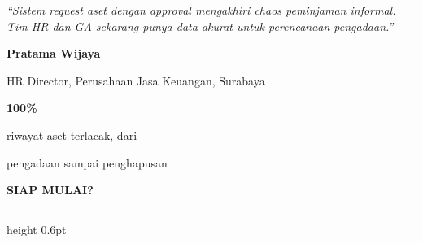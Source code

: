 \documentclass[a4paper]{article}
\newcommand{\sectiontitle}[1]{%
    \vspace{10pt}%
    {\fontsize{13}{16}\selectfont\bfseries\color{BlueDark} #1}\par\vspace{3pt}%
    {\color{BluePrimary}\hrule height 0.6pt}\par\vspace{8pt}}
\begin{document}
\noindent
\begin{minipage}[t]{0.485\textwidth}
    \colorbox{BlueBg}{%
        \begin{minipage}{\dimexpr\linewidth-2\fboxsep\relax}
            {\fontsize{9.5}{13}\selectfont\color{TextDark}\textit{``Sistem request aset dengan approval mengakhiri chaos peminjaman informal. Tim HR dan GA sekarang punya data akurat untuk perencanaan pengadaan.''}}\par\vspace{4pt}
            {\fontsize{8.5}{11}\selectfont\bfseries\color{BluePrimary} Pratama Wijaya}\par
            {\fontsize{8}{10}\selectfont\color{TextLight} HR Director, Perusahaan Jasa Keuangan, Surabaya}
        \end{minipage}}
\end{minipage}%
\hfill
\begin{minipage}[t]{0.485\textwidth}
    \colorbox{BlueBg}{%
        \begin{minipage}{\dimexpr\linewidth-2\fboxsep\relax}
            \begin{center}
                {\fontsize{20}{24}\selectfont\bfseries\color{BluePrimary} 100\%}\par
                {\fontsize{9.5}{12}\selectfont\color{TextDark} riwayat aset terlacak, dari}\par
                {\fontsize{9.5}{12}\selectfont\color{TextDark} pengadaan sampai penghapusan}
            \end{center}
        \end{minipage}}
\end{minipage}

\sectiontitle{SIAP MULAI?}
\end{document}
